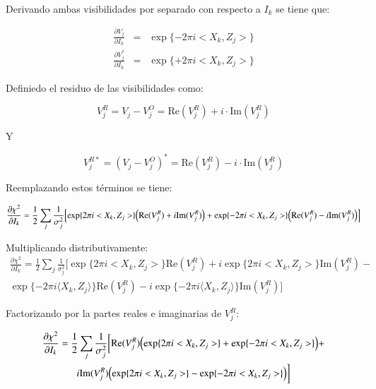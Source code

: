 Derivando ambas visibilidades por separado con respecto a $I_{k}$ se tiene que:

\begin{eqnarray}
\frac{\partial V_{j}}{\partial I_{k}} & = & \exp\{-2\pi i<X_k,Z_j>\} \\
\frac{\partial V_{j}^{*}}{\partial I_{k}} & = & \exp\{+2\pi i<X_k,Z_j>\}
\end{eqnarray}

Definiedo el residuo de las visibilidades como:

\begin{equation}
V_{j}^{R} = V_{j}-V_{j}^{O} = \text{Re}(V_{j}^{R}) + i\cdot \text{Im}(V_{j}^{R})
\end{equation}

Y

\begin{equation}
V_{j}^{R*} = (V_{j}-V_{j}^{O})^{*}=\text{Re}(V_{j}^{R})-i\cdot \text{Im}(V_{j}^{R})
\end{equation}

Reemplazando estos términos se tiene:


\begin{equation}
\frac{\partial\chi^{2}}{\partial I_{k}} = \frac{1}{2}\sum\limits_{j}\frac{1}{\sigma_{j}^{2}}\Bigl[\exp\{2\pi i<X_k,Z_j>\}\Bigl(\text{Re}(V_{j}^{R})+i\text{Im}(V_{j}^{R})\Bigr)+
              \exp\{-2\pi i<X_k,Z_j>\}\Bigl(\text{Re}(V_{j}^{R})-i\text{Im}(V_{j}^{R})\Bigr)\Bigr]
\end{equation}

Multiplicando distributivamente:
\begin{multline}
\frac{\partial\chi^{2}}{\partial I_{k}} = \frac{1}{2}\sum\limits_{j}\frac{1}{\sigma_{j}^{2}}\biggl[\exp\{2\pi i<X_k,Z_j>\}\text{Re}(V_{j}^{R})+i\exp\{2\pi i<X_k,Z_j>\}\text{Im}(V_{j}^{R})-\\
\exp\{-2\pi i \langle X_k,Z_j \rangle\}\text{Re}(V_{j}^{R})-i\exp\{-2\pi i\langle X_k,Z_j \rangle\}\text{Im}(V_{j}^{R})\biggr]
\end{multline}


Factorizando por la partes reales e imaginarias de $V_{j}^{R}$:

\begin{multline}
\frac{\partial\chi^{2}}{\partial I_{k}} = \frac{1}{2}\sum\limits_{j}\frac{1}{\sigma_{j}^{2}}\biggl[\text{Re}(V_{j}^{R})\Bigl(\exp\{2\pi i<X_k,Z_j>\}+\exp\{-2\pi i<X_k,Z_j>\}\Bigr)+ \\ i\text{Im}(V_{j}^{R})\Bigl(\exp\{2\pi i<X_k,Z_j>\}-\exp\{-2\pi i<X_k,Z_j>\}\Bigr)\biggr]
\end{multline}

